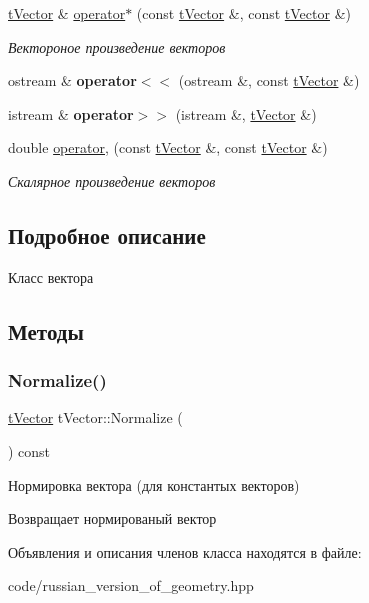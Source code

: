 \begin{DoxyCompactItemize}
\hyperlink{classtVector}{t\+Vector} \& \hyperlink{classtVector_abec310e2c4d30878d11d0b2f5d02cad4}{operator$\ast$} (const \hyperlink{classtVector}{t\+Vector} \&, const \hyperlink{classtVector}{t\+Vector} \&)
\begin{DoxyCompactList}\small\item\em Вектороное произведение векторов \end{DoxyCompactList}\item 
\mbox{\label{classtVector_afcc0074f806c5d4f45eb32158292ca8c}} 
ostream \& {\bfseries operator$<$$<$} (ostream \&, const \hyperlink{classtVector}{t\+Vector} \&)
\item 
\mbox{\label{classtVector_a40b256a9f985011f794517f158deffe5}} 
istream \& {\bfseries operator$>$$>$} (istream \&, \hyperlink{classtVector}{t\+Vector} \&)
\item 
\mbox{\label{classtVector_a79cac88f76447395991d4dde1f173bfa}} 
double \hyperlink{classtVector_a79cac88f76447395991d4dde1f173bfa}{operator,} (const \hyperlink{classtVector}{t\+Vector} \&, const \hyperlink{classtVector}{t\+Vector} \&)
\begin{DoxyCompactList}\small\item\em Скалярное произведение векторов \end{DoxyCompactList}\end{DoxyCompactItemize}


\subsection{Подробное описание}
Класс вектора 

\subsection{Методы}
\mbox{\label{classtVector_a6141302c1bbad21b64e56d93ed0408e5}} 
\subsubsection{\texorpdfstring{Normalize()}{Normalize()}}
{\footnotesize\ttfamily \hyperlink{classtVector}{t\+Vector} t\+Vector\+::\+Normalize (\begin{DoxyParamCaption}{ }\end{DoxyParamCaption}) const}

Нормировка вектора (для константых векторов) \begin{DoxyReturn}{Возвращает}
нормированый вектор 
\end{DoxyReturn}


Объявления и описания членов класса находятся в файле\+:\begin{DoxyCompactItemize}
\item 
code/russian\+\_\+version\+\_\+of\+\_\+geometry.\+hpp\end{DoxyCompactItemize}
